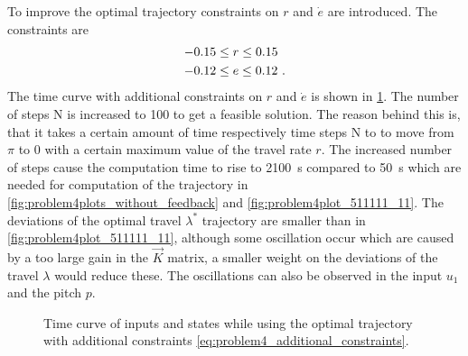 To improve the optimal trajectory constraints on $r$ and $\dot{e}$ are introduced. The constraints are
\begin{subequations}
	\begin{align}
	-0.15&\leq r\leq0.15\\
	-0.12&\leq e\leq0.12\FullStop
	\end{align}
	\label{eq:problem4_additional_constraints}%
\end{subequations}
The time curve with additional constraints on $r$ and $\dot{e}$ is shown in \cref{fig:LQR_bothconstraint_N=100_LQR}. The number of steps N is increased to 100 to get a feasible solution.  The reason behind this is, that it takes a certain amount of time respectively time steps N to to move from $\pi$ to 0 with a certain maximum value  of the travel rate $r$. The increased number of steps cause the computation time to rise to \SI{2100}{\second} compared to \SI{50}{\second} which are needed for computation of the trajectory in \cref{fig:problem4plots_without_feedback} and \cref{fig:problem4plot_511111_11}. The deviations of the optimal travel $\lambda^*$ trajectory are smaller than in \cref{fig:problem4plot_511111_11}, although some oscillation occur which are caused by a too large gain in the $\vec{K}$ matrix, a smaller weight on the deviations of the travel $\lambda$ would reduce these. The oscillations can also be observed in the input $u_1$ and the pitch $p$. 



\begin{figure}[htbp]
	\centering
	\caption{Time curve of inputs and states while using the optimal trajectory with additional constraints \eqref{eq:problem4_additional_constraints}.}
	\label{fig:LQR_bothconstraint_N=100_LQR}%
\end{figure}

